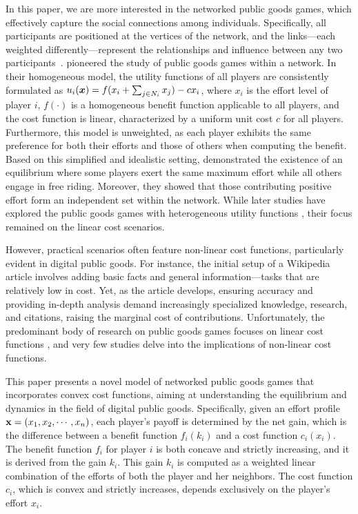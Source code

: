 In this paper, we are more interested in the networked public goods games, which effectively capture the social connections 
among individuals. Specifically, all participants are positioned at the vertices of the network, and the links—each weighted differently—represent the relationships and influence between any two participants~\cite{jichen:li2023altruism}.
\citet{public-network:bramoulle2007public} pioneered the study of public goods games within a network. 
In their homogeneous model, the utility functions of all players are consistently formulated as $u_i({\bm{x}}) = f(x_i + \sum_{j \in N_i} x_j) - cx_i$, where $x_i$ is the effort level of player $i$, $f(\cdot)$ is a homogeneous benefit function applicable to all players, and the cost function is linear, characterized by a uniform unit cost $c$ for all players. 
Furthermore, this model is unweighted, as each player exhibits the same preference for both their efforts and those of others when computing the benefit.
Based on this simplified and idealistic setting, \citet{public-network:bramoulle2007public} demonstrated the existence of an equilibrium where some players exert the same maximum effort while all others engage in free riding. Moreover, they showed that those contributing positive effort form an independent set within the network. 
While later studies have explored the public goods games with heterogeneous utility functions \cite{public-network-direct-complexity:papadimitriou2021public,public-network-direct-BRD:bayer2023best}, their focus remained on the linear cost scenarios.

However, practical scenarios often feature non-linear cost functions, particularly evident in digital public goods.
For instance, the initial setup of a Wikipedia article involves adding basic facts and general information—tasks that are relatively low in cost. Yet, as the article develops, ensuring accuracy and providing in-depth analysis demand increasingly specialized knowledge, research, and citations, raising the marginal cost of contributions. Unfortunately, the predominant body of research on public goods games focuses on linear cost functions \cite{public-network:bramoulle2007public,public-network-direct:lopez2013public,public-network-direct-complexity:papadimitriou2021public,public-network-direct-BRD:bayer2023best},  and very few studies delve into the implications of non-linear cost functions.

This paper presents a novel model of networked public goods games that incorporates convex cost functions, aiming at understanding the equilibrium and dynamics in the field of digital public goods. 
Specifically, given an effort profile $\mathbf{x}=(x_1,x_2,\cdots,x_n)$, each player's payoff is determined by the net gain, which is the difference between a benefit function $f_i(k_i)$ and a cost function $c_i(x_i)$. The benefit function $f_i$ for player $i$ is both concave and strictly increasing, and it is derived from the gain $k_i$. This gain $k_i$ is computed as a weighted linear combination of the efforts of both the player and her neighbors. The cost function $c_i$, which is convex and strictly increases, depends exclusively on the player's effort $x_i$.


